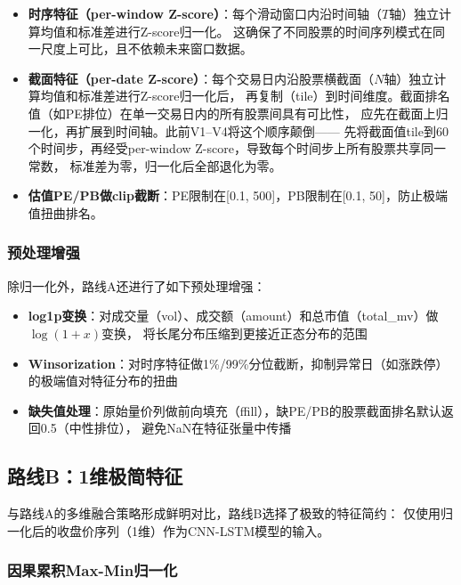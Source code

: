 \documentclass[12pt,a4paper]{ctexart}
\begin{document}
\begin{itemize}[leftmargin=*]
    \item \textbf{时序特征（per-window Z-score）}：每个滑动窗口内沿时间轴（$T$轴）独立计算均值和标准差进行Z-score归一化。
          这确保了不同股票的时间序列模式在同一尺度上可比，且不依赖未来窗口数据。
    \item \textbf{截面特征（per-date Z-score）}：每个交易日内沿股票横截面（$N$轴）独立计算均值和标准差进行Z-score归一化后，
          再复制（tile）到时间维度。截面排名值（如PE排位）在单一交易日内的所有股票间具有可比性，
          应先在截面上归一化，再扩展到时间轴。此前V1--V4将这个顺序颠倒——
          先将截面值tile到60个时间步，再经受per-window Z-score，导致每个时间步上所有股票共享同一常数，
          标准差为零，归一化后全部退化为零。
    \item \textbf{估值PE/PB做clip截断}：PE限制在[0.1, 500]，PB限制在[0.1, 50]，防止极端值扭曲排名。
\end{itemize}

\subsubsection{预处理增强}

除归一化外，路线A还进行了如下预处理增强：

\begin{itemize}[leftmargin=*]
    \item \textbf{log1p变换}：对成交量（vol）、成交额（amount）和总市值（total\_mv）做$\log(1+x)$变换，
          将长尾分布压缩到更接近正态分布的范围
    \item \textbf{Winsorization}：对时序特征做1\%/99\%分位截断，抑制异常日（如涨跌停）的极端值对特征分布的扭曲
    \item \textbf{缺失值处理}：原始量价列做前向填充（ffill），缺PE/PB的股票截面排名默认返回0.5（中性排位），
          避免NaN在特征张量中传播
\end{itemize}

\subsection{路线B：1维极简特征}

与路线A的多维融合策略形成鲜明对比，路线B选择了极致的特征简约：
仅使用归一化后的收盘价序列（1维）作为CNN-LSTM模型的输入。

\subsubsection{因果累积Max-Min归一化}
\end{document}

